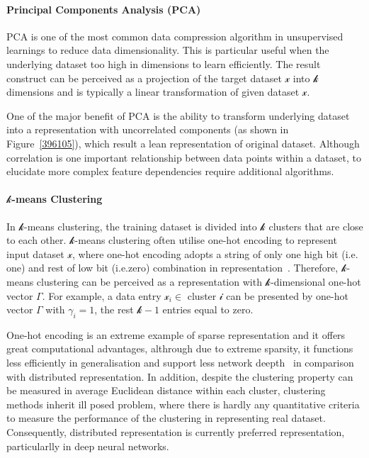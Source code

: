 \paragraph{Principal Components Analysis (PCA)}
PCA is one of the most common data compression algorithm in unsupervised learnings to reduce data dimensionality. This is particular useful when the underlying dataset too high in dimensions to learn efficiently. The result construct can be perceived as a projection of the target dataset $\mathcal{x}$ into $\mathcal{k}$ dimensions and is typically a linear transformation of given dataset $\mathcal{x}$.
\par 
One of the major benefit of PCA is the ability to transform underlying dataset into a representation with uncorrelated components (as shown in Figure~\ref{396105}), which result a lean representation of original dataset. Although correlation is one important relationship between data points within a dataset, to elucidate more complex feature dependencies require additional algorithms. 

\paragraph{$\mathcal{k}$-means Clustering}
In $\mathcal{k}$-means clustering, the training dataset is divided into $\mathcal{k}$ clusters that are close to each other.  $\mathcal{k}$-means clustering often utilise one-hot encoding to represent input dataset $\mathcal{x}$, where one-hot encoding adopts a string of only one high bit (i.e. one) and rest of low bit (i.e.zero) combination in representation~\cite{Harris:2012:DDC:2381028}. Therefore, $\mathcal{k}$-means clustering can be perceived as a representation with $\mathcal{k}$-dimensional one-hot vector $\Gamma$. For example, a data entry $\mathcal{x}_i \in$ cluster $\mathcal{i}$ can be presented by one-hot vector $\Gamma$ with $\gamma_i = 1$, the rest $\mathcal{k}-1$ entries equal to zero.
\par 
One-hot encoding is an extreme example of sparse representation and it offers great computational advantages, althrough due to extreme sparsity, it functions less efficiently in generalisation and support less network deepth~\cite{LeCun_2015} in comparison with distributed representation. In addition, despite the clustering property can be measured in average Euclidean distance within each cluster, clustering methods inherit ill posed problem, where there is hardly any quantitative criteria to measure the performance of the clustering in representing real dataset.  Consequently, distributed representation is currently preferred representation, particularlly in deep neural networks. 